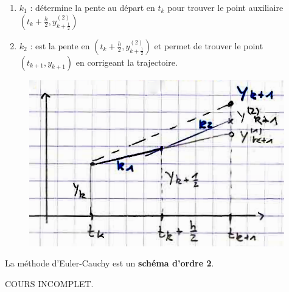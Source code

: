 \begin{enumerate}[label=-]
    \item $k_1$ : détermine la pente au départ en $t_k$ pour trouver le point auxiliaire $(t_k + \frac{h}{2},y_{k+\frac{1}{2}}^{(2)})$

    \item $k_2$ : est la pente en $(t_k + \frac{h}{2}, y_{k+\frac{1}{2}}^{(2)})$ et permet de trouver
        le point $(t_{k+1},y_{k+1})$ en corrigeant la trajectoire.

\end{enumerate}
    \begin{figure}
        \centering
        \includegraphics[scale=0.42]{5-EDO-eulercauch.png}
    \end{figure}

La méthode d'Euler-Cauchy est un \textbf{schéma d'ordre 2}.


\vspace{5cm}
COURS INCOMPLET.


